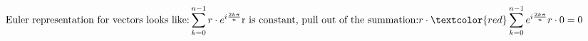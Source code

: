 \documentclass[preview]{standalone}
\begin{document}
\begin{align*}
\text{Euler representation for vectors looks like:} \sum_{k=0}^{n-1} r \cdot e^{i\frac{2k\pi}{n}} \text{r is constant, pull out of the summation:} r \cdot \textcolor{red}\sum_{k=0}^{n-1} e^{i\frac{2k\pi}{n}} r \cdot 0 = 0
\end{align*}
\end{document}
